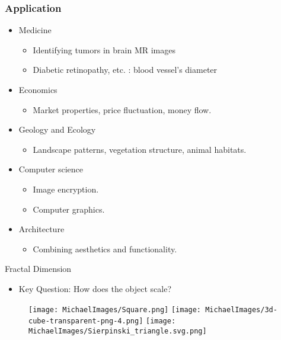 \begin{frame}
	\frametitle{Application}
	\begin{itemize}
		\item Medicine
		\begin{itemize}
			\item Identifying tumors in brain MR images \cite{iftekharuddin2003fractal}
			\item Diabetic retinopathy, etc. : blood vessel's diameter \cite{uahabi2015applications}
		\end{itemize}
		\item Economics
		\begin{itemize}
			\item Market properties, price fluctuation, money flow. \cite{takayasu2009fractals}
		\end{itemize}
		\item Geology and Ecology
		\begin{itemize}
			\item Landscape patterns, vegetation structure, animal habitats. \cite{LOEHLE1996271}
		\end{itemize}
		\item Computer science
		\begin{itemize}
			\item Image encryption. \cite{sangavi2019image}
			\item Computer graphics. \cite{sala2021fractal}
		\end{itemize}
		\item Architecture
		\begin{itemize}
			\item Combining aesthetics and functionality. \cite{lorenz2002fractals}
		\end{itemize}
	\end{itemize}
\end{frame}

\begin{frame}{Fractal Dimension}
	\begin{itemize}
		\item Key Question: How does the object scale?
	\end{itemize}
	\begin{figure}
		\centering
		\texttt{[image: MichaelImages/Square.png]}
		\texttt{[image: MichaelImages/3d-cube-transparent-png-4.png]}
		\texttt{[image: MichaelImages/Sierpinski\_triangle.svg.png]}
		\caption{\cite{555w}}
	\end{figure}
	\end{frame}
	
